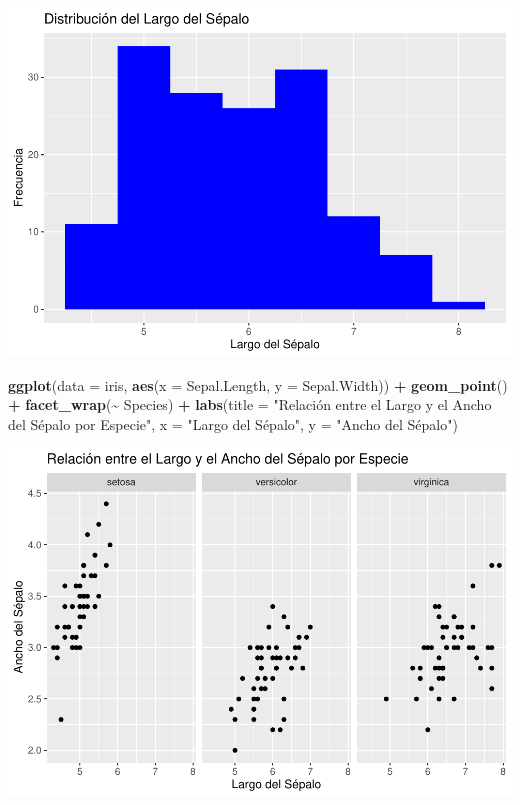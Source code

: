 \documentclass[
]{book}
\newenvironment{Shaded}{\begin{snugshade}}{\end{snugshade}}
\newcommand{\AttributeTok}[1]{\textcolor[rgb]{0.13,0.29,0.53}{#1}}
\newcommand{\FunctionTok}[1]{\textcolor[rgb]{0.13,0.29,0.53}{\textbf{#1}}}
\newcommand{\NormalTok}[1]{#1}
\newcommand{\SpecialCharTok}[1]{\textcolor[rgb]{0.81,0.36,0.00}{\textbf{#1}}}
\newcommand{\StringTok}[1]{\textcolor[rgb]{0.31,0.60,0.02}{#1}}
\begin{document}
\includegraphics{bookdown-demo_files/figure-latex/unnamed-chunk-178-1.pdf}

\begin{Shaded}
\begin{Highlighting}[]
\FunctionTok{ggplot}\NormalTok{(}\AttributeTok{data =}\NormalTok{ iris, }\FunctionTok{aes}\NormalTok{(}\AttributeTok{x =}\NormalTok{ Sepal.Length, }\AttributeTok{y =}\NormalTok{ Sepal.Width)) }\SpecialCharTok{+} 
  \FunctionTok{geom\_point}\NormalTok{() }\SpecialCharTok{+}
  \FunctionTok{facet\_wrap}\NormalTok{(}\SpecialCharTok{\textasciitilde{}}\NormalTok{ Species) }\SpecialCharTok{+}
  \FunctionTok{labs}\NormalTok{(}\AttributeTok{title =} \StringTok{"Relación entre el Largo y el Ancho del Sépalo por Especie"}\NormalTok{,}
       \AttributeTok{x =} \StringTok{"Largo del Sépalo"}\NormalTok{,}
       \AttributeTok{y =} \StringTok{"Ancho del Sépalo"}\NormalTok{)}
\end{Highlighting}
\end{Shaded}

\includegraphics{bookdown-demo_files/figure-latex/unnamed-chunk-179-1.pdf}
\end{document}
